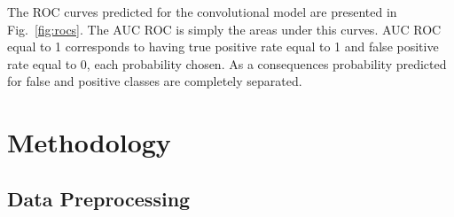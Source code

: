 \documentclass{report}
\begin{document}
 
 The ROC curves predicted for the convolutional model 
 are presented in Fig.~\ref{fig:rocs}. The AUC ROC is simply the areas under this curves. 
 AUC ROC equal to 1 corresponds to having true positive rate equal to 1 and 
 false positive rate  equal to 0, each probability chosen. As a consequences probability
 predicted for false and positive classes are completely separated. 
 

\chapter{Methodology}

\section{Data Preprocessing}
\end{document}
